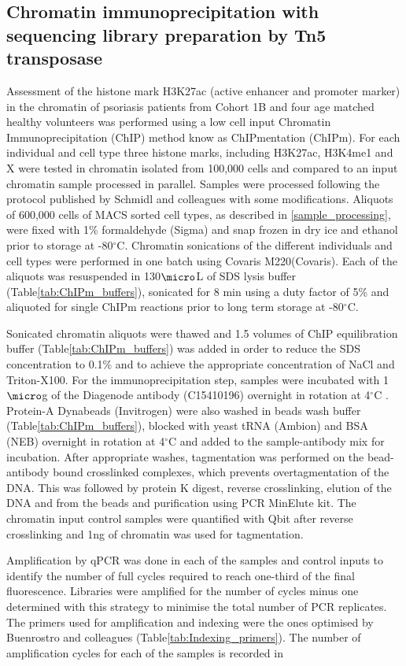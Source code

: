 \subsection{Chromatin immunoprecipitation with sequencing library preparation by Tn5 transposase}
Assessment of the histone mark H3K27ac (active enhancer and promoter marker) in the chromatin of psoriasis patients from Cohort 1B and four age matched healthy volunteers was performed using a low cell input Chromatin Immunoprecipitation (ChIP) method know as ChIPmentation (ChIPm). For each individual and cell type three histone marks, including H3K27ac, H3K4me1 and X were tested in chromatin isolated from 100,000 cells and compared to an input chromatin sample processed in parallel. Samples were processed following the protocol published by Schmidl and colleagues \parencite{Schmidl2015} with some modifications. Aliquots of 600,000 cells of MACS sorted cell types, as described in \ref{sample_processing}, were fixed with 1\% formaldehyde (Sigma) and snap frozen in dry ice and ethanol prior to storage at -80{$^\circ$}C. Chromatin sonications of the different individuals and cell types were performed in one batch using Covaris M220(Covaris). Each of the aliquots was resuspended in 130$\micro$L of SDS lysis buffer (Table\ref{tab:ChIPm_buffers}), sonicated for 8 min using a duty factor of 5\% and aliquoted for single ChIPm reactions prior to long term storage at -80{$^\circ$}C.

Sonicated chromatin aliquots were thawed and 1.5 volumes of ChIP equilibration buffer (Table\ref{tab:ChIPm_buffers}) was added in order to  reduce the SDS concentration to 0.1\% and to achieve the appropriate concentration of NaCl and Triton-X100. For the immunoprecipitation step, samples were incubated with 1$\micro$g of the Diagenode antibody (C15410196) overnight in rotation at 4{$^\circ$}C . Protein-A Dynabeads (Invitrogen) were also washed in beads wash buffer (Table\ref{tab:ChIPm_buffers}), blocked with yeast tRNA (Ambion) and BSA (NEB) overnight in rotation at 4{$^\circ$}C and added to the sample-antibody mix for incubation. After appropriate washes, tagmentation was performed on the bead-antibody bound crosslinked complexes, which prevents overtagmentation of the DNA. This was followed by protein K digest, reverse crosslinking, elution of the DNA and from the beads and purification using PCR MinElute kit. The chromatin input control samples were quantified with Qbit after reverse crosslinking and 1ng of chromatin was used for tagmentation.

Amplification by qPCR was done in each of the samples and control inputs to identify the number of full cycles required to reach one-third of the final fluorescence. Libraries were amplified for the number of cycles minus one determined with this strategy to minimise the total number of PCR replicates. The primers used for amplification and indexing were the ones optimised by Buenrostro and colleagues (Table\ref{tab:Indexing_primers}). The number of amplification cycles for each of the samples is recorded in %

